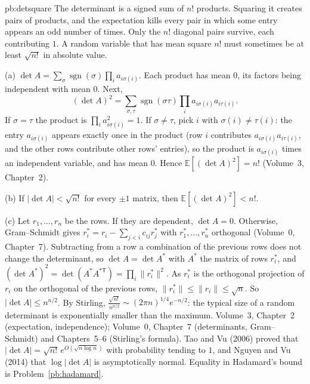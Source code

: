 \begin{solution}{pb:detsquare}
\idea The determinant is a signed sum of $n!$ products. Squaring it creates pairs of products, and the expectation kills every
pair in which some entry appears an odd number of times. Only the $n!$ diagonal pairs survive, each contributing $1$. A random
variable that has mean square $n!$ must sometimes be at least $\sqrt{n!}$ in absolute value.

\writeup (a) $\det A=\sum_\sigma\operatorname{sgn}(\sigma)\prod_ia_{i\sigma(i)}$. Each product has mean $0$, its factors being
independent with mean $0$. Next,
\[
(\det A)^2=\sum_{\sigma,\tau}\operatorname{sgn}(\sigma\tau)\prod_ia_{i\sigma(i)}a_{i\tau(i)}.
\]
If $\sigma=\tau$ the product is $\prod_ia_{i\sigma(i)}^2=1$. If $\sigma\ne\tau$, pick $i$ with $\sigma(i)\ne\tau(i)$: the entry
$a_{i\sigma(i)}$ appears exactly once in the product (row $i$ contributes $a_{i\sigma(i)}a_{i\tau(i)}$, and the other rows
contribute other rows' entries), so the product is $a_{i\sigma(i)}$ times an independent variable, and has mean $0$. Hence
$\mathbb E[(\det A)^2]=n!$ (Volume~3, Chapter~2).

(b) If $|\det A|<\sqrt{n!}$ for every $\pm1$ matrix, then $\mathbb E[(\det A)^2]<n!$.

(c) Let $r_1,\dots,r_n$ be the rows. If they are dependent, $\det A=0$. Otherwise, Gram--Schmidt gives
$r_i^*=r_i-\sum_{j<i}c_{ij}r_j^*$ with $r_1^*,\dots,r_n^*$ orthogonal (Volume~0, Chapter~7). Subtracting from a row a combination
of the previous rows does not change the determinant, so $\det A=\det A^*$ with $A^*$ the matrix of rows $r_i^*$, and
$(\det A^*)^2=\det(A^*A^{*\mathsf T})=\prod_i\|r_i^*\|^2$. As $r_i^*$ is the orthogonal projection of $r_i$ on the orthogonal
of the previous rows, $\|r_i^*\|\le\|r_i\|\le\sqrt n$. So $|\det A|\le n^{n/2}$. By Stirling, $\frac{\sqrt{n!}}{n^{n/2}}\sim
(2\pi n)^{1/4}e^{-n/2}$: the typical size of a random determinant is exponentially smaller than the maximum.
\tools Volume~3, Chapter~2 (expectation, independence); Volume~0, Chapter~7 (determinants, Gram--Schmidt) and Chapters~5--6 (Stirling's formula).
\leads Tao and Vu (2006) proved that $|\det A|=\sqrt{n!}\,e^{O(\sqrt{n\log n})}$ with probability tending to $1$, and Nguyen and
Vu (2014) that $\log|\det A|$ is asymptotically normal. Equality in Hadamard's bound is Problem~\ref{pb:hadamard}.
\end{solution}


